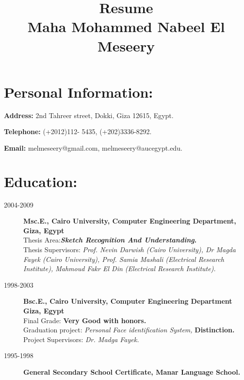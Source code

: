 \documentclass{article}
\title { Resume \\ Maha Mohammed Nabeel El Meseery}
\date{}
\begin{document}
\maketitle
\section*{Personal Information:}
\noindent
 \textbf{ Address: } 2nd Tahreer street, Dokki, Giza 12615, Egypt.

 \textbf{ Telephone:} (+2012)112- 5435, (+202)3336-8292.

\textbf{  Email: } melmeseery@gmail.com, melmeseery@aucegypt.edu.
 \section*{Education:}
  \begin{description}
 \item [2004-2009]  \textbf{ Msc.E., Cairo University, Computer Engineering Department, Giza, Egypt}\\
 Thesis Area:\textbf{\textit{Sketch Recognition And Understanding}.}\\
 Thesis Supervisors: \textit{Prof. Nevin Darwish (Cairo University), Dr Magda
 Fayek (Cairo University), Prof. Samia Mashali (Electrical Research Institute),
 Mahmoud Fakr El Din (Electrical Research Institute).}
 \item[1998-2003]  \textbf{ Bsc.E., Cairo University, Computer Engineering Department Giza, Egypt}\\
  Final Grade: \textbf{Very Good with honors.}\\
  Graduation project: \textit{Personal Face identification System,} \textbf{Distinction.}\\
  Project Supervisors: \textit{Dr. Madga Fayek.}
\item [1995-1998]  \textbf{General Secondary School Certificate,   Manar
 Language School. }
  \end{description}
\end{document}
